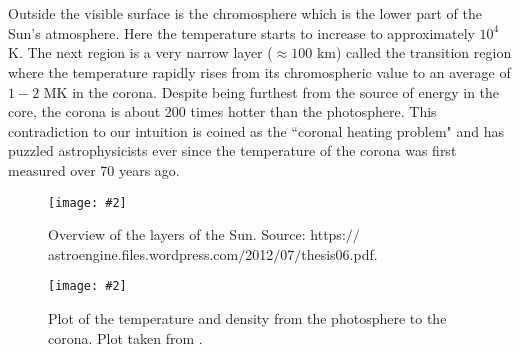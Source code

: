 \documentclass[12pt]{ociamthesis}
\newcommand{\mfig}[4]{
  \begin{figure}
  \begin{center}
  \texttt{[image: \#2]}
  \caption{#3}
  \label{#4}
  \end{center}
  \end{figure}}
\begin{document}
\\ \\ Outside the visible surface is the chromosphere which is the lower part of the Sun's atmosphere. Here the temperature starts to increase to approximately $10^4$ K. The next region is a very narrow layer ($\approx 100$ km) called the transition region where the temperature rapidly rises from its chromospheric value to an average of $1-2$ MK in the corona. Despite being furthest from the source of energy in the core, the corona is about 200 times hotter than the photosphere. This contradiction to our intuition is coined as the ``coronal heating problem" and has puzzled astrophysicists ever since the temperature of the corona was first measured over 70 years ago.   
\mfig{0.8}{figures/on.png}{Overview of the layers of the Sun. Source: https:$//$astroengine.files.wordpress.com$/$2012$/$07$/$thesis06.pdf.}{on_model}
\mfig{0.725}{figures/T_regoins}{Plot of the temperature and density from the photosphere to the corona. Plot taken from \cite{Lang_2006ses}.}{t_profile_sun}
\end{document}
